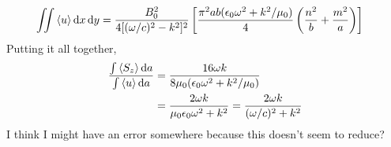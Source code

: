 \documentclass{homework}
\begin{document}
\begin{enumerate}
\begin{align*}
			\iint \expval{u} \dd{x} \dd{y} & = \frac{B_0^2 }{4 [(\omega / c)^2 - k^2]^2} \left[
				\frac{ \pi^2 ab(\epsilon_0 \omega^2 + k^2/\mu_0) }{4} \left(\frac{n^2}{b} + \frac{m^2}{a} \right)
			\right]
		\end{align*}
		Putting it all together, \begin{align*}
			\frac{\int \expval{S_z} \dd{a}}{\int \expval{u} \dd{a}} & = \frac{16 \omega k}{8 \mu_0 (\epsilon_0 \omega^2 + k^2/\mu_0)} \\
				& = \frac{2\omega k}{\mu_0 \epsilon_0 \omega^2 + k^2} = \frac{2 \omega k}{(\omega / c)^2 + k^2}
		\end{align*}
		I think I might have an error somewhere because this doesn't seem to reduce?
	\end{enumerate}
\end{document}
